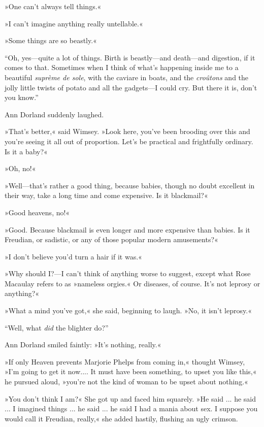 »One can't always tell things.«

»I can't imagine anything really untellable.«

»Some things are so beastly.«

\enquote{Oh, yes\allowbreak---\allowbreak quite a lot of things. Birth is beastly\allowbreak---\allowbreak and death\allowbreak---\allowbreak and digestion, if it comes to that. Sometimes when I think of what's happening inside me to a beautiful \textit{suprème de sole}, with the caviare in boats, and the \textit{croûtons} and the jolly little twists of potato and all the gadgets\allowbreak---\allowbreak I could cry. But there it is, don't you know.}

Ann Dorland suddenly laughed.

»That's better,« said Wimsey. »Look here, you've been brooding over this and you're seeing it all out of proportion. Let's be practical and frightfully ordinary. Is it a baby?«

»Oh, no!«

»Well\allowbreak---\allowbreak that's rather a good thing, because babies, though no doubt excellent in their way, take a long time and come expensive. Is it blackmail?«

»Good heavens, no!«

»Good. Because blackmail is even longer and more expensive than babies. Is it Freudian, or sadistic, or any of those popular modern amusements?«

»I don't believe you'd turn a hair if it was.«

»Why should I?---I can't think of anything worse to suggest, except what Rose Macaulay refers to as »nameless orgies.« Or diseases, of course. It's not leprosy or anything?«

»What a mind you've got,« she said, beginning to laugh. »No, it isn't leprosy.«

\enquote{Well, what \textit{did} the blighter do?}

Ann Dorland smiled faintly: »It's nothing, really.«

»If only Heaven prevents Marjorie Phelps from coming in,« thought Wimsey, »I'm going to get it now.... It must have been something, to upset you like this,« he pursued aloud, »you're not the kind of woman to be upset about nothing.«

»You don't think I am?« She got up and faced him squarely. »He said ... he said ... I imagined things ... he said ... he said I had a mania about sex. I suppose you would call it Freudian, really,« she added hastily, flushing an ugly crimson.

